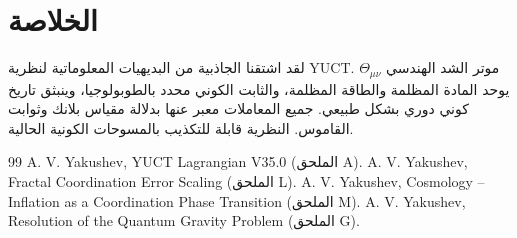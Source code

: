 \documentclass[12pt,a4paper]{article}
\begin{document}
	\section{الخلاصة}
	لقد اشتقنا الجاذبية من البديهيات المعلوماتية لنظرية YUCT. موتر الشد الهندسي \(\Theta_{\mu\nu}\) يوحد المادة المظلمة والطاقة المظلمة، والثابت الكوني محدد بالطوبولوجيا، وينبثق تاريخ كوني دوري بشكل طبيعي. جميع المعاملات معبر عنها بدلالة مقياس بلانك وثوابت القاموس. النظرية قابلة للتكذيب بالمسوحات الكونية الحالية.
	
	\begin{thebibliography}{99}
		\renewcommand{\refname}{المراجع}
		 A. V. Yakushev, YUCT Lagrangian V35.0 (الملحق A).
		 A. V. Yakushev, Fractal Coordination Error Scaling (الملحق L).
		 A. V. Yakushev, Cosmology -- Inflation as a Coordination Phase Transition (الملحق M).
		 A. V. Yakushev, Resolution of the Quantum Gravity Problem (الملحق G).
	\end{thebibliography}
	
\end{document}
